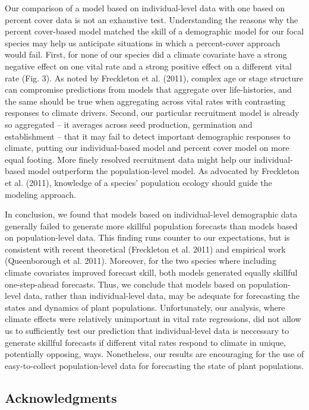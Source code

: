 \documentclass[12pt,]{article}
\begin{document}
Our comparison of a model based on individual-level data with one based
on percent cover data is not an exhaustive test. Understanding the
reasons why the percent cover-based model matched the skill of a
demographic model for our focal species may help us anticipate
situations in which a percent-cover approach would fail. First, for none
of our species did a climate covariate have a strong negative effect on
one vital rate and a strong positive effect on a different vital rate
(Fig. 3). As noted by Freckleton et al. (2011), complex age or stage
structure can compromise predictions from models that aggregate over
life-histories, and the same should be true when aggregating across
vital rates with contrasting responses to climate drivers. Second, our
particular recruitment model is already so aggregated -- it averages
across seed production, germination and establishment -- that it may
fail to detect important demographic responses to climate, putting our
individual-based model and percent cover model on more equal footing.
More finely resolved recruitment data might help our individual-based
model outperform the population-level model. As advocated by Freckleton
et al. (2011), knowledge of a species' population ecology should guide
the modeling approach.

In conclusion, we found that models based on individual-level
demographic data generally failed to generate more skillful population
forecasts than models based on population-level data. This finding runs
counter to our expectations, but is consistent with recent theoretical
(Freckleton et al. 2011) and empirical work (Queenborough et al. 2011).
Moreover, for the two species where including climate covariates
improved forecast skill, both models generated equally skillful
one-step-ahead forecasts. Thus, we conclude that models based on
population-level data, rather than individual-level data, may be
adequate for forecasting the states and dynamics of plant populations.
Unfortunately, our analysis, where climate effects were relatively
unimportant in vital rate regressions, did not allow us to sufficiently
test our prediction that individual-level data is neccessary to generate
skillful forecasts if different vital rates respond to climate in
unique, potentially opposing, ways. Nonetheless, our results are
encouraging for the use of easy-to-collect population-level data for
forecasting the state of plant populations.

\subsection{Acknowledgments}\label{acknowledgments}
\end{document}
